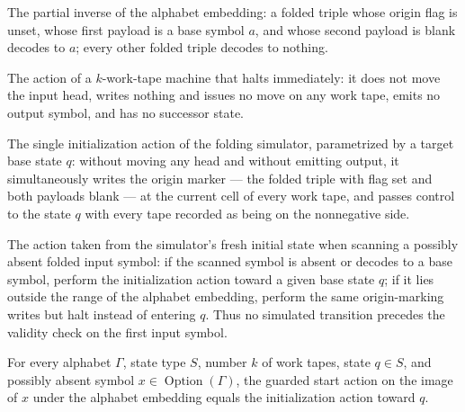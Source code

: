 \begin{definition}
\label{Turing.FinTM.foldDecode}
\leanok
{}
The partial inverse of the alphabet embedding: a folded triple whose origin flag is
unset, whose first payload is a base symbol $a$, and whose second payload is blank
decodes to $a$; every other folded triple decodes to nothing.
\end{definition}

\begin{definition}
\label{Turing.FinTM.foldHalt}
\leanok
{}
The action of a $k$-work-tape machine that halts immediately: it does not move the
input head, writes nothing and issues no move on any work tape, emits no output
symbol, and has no successor state.
\end{definition}

\begin{definition}
\label{Turing.FinTM.foldInitAction}
\leanok
{}
The single initialization action of the folding simulator, parametrized by a target
base state $q$: without moving any head and without emitting output, it
simultaneously writes the origin marker --- the folded triple with flag set and
both payloads blank --- at the current cell of every work tape, and passes control
to the state $q$ with every tape recorded as being on the nonnegative side.
\end{definition}

\begin{definition}
\label{Turing.FinTM.foldStartAction}
\leanok
{}
The action taken from the simulator's fresh initial state when scanning a possibly
absent folded input symbol: if the scanned symbol is absent or decodes to a base
symbol, perform the initialization action toward a given base state $q$; if it lies
outside the range of the alphabet embedding, perform the same origin-marking writes
but halt instead of entering $q$.  Thus no simulated transition precedes the
validity check on the first input symbol.
\end{definition}

\begin{lemma}
\label{Turing.FinTM.foldStartAction_embed}
\leanok
{}
For every alphabet $\Gamma$, state type $S$, number $k$ of work tapes, state $q\in S$,
and possibly absent symbol $x\in\operatorname{Option}(\Gamma)$, the guarded start action
on the image of $x$ under the alphabet embedding equals the initialization action toward
$q$.
\end{lemma}

